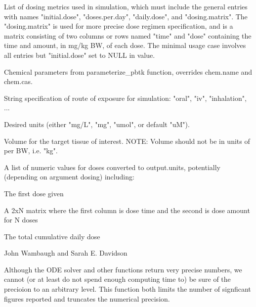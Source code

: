 \documentclass[a4paper]{book}
\begin{document}
%
\begin{Arguments}
\begin{ldescription}
\item[\code{dosing}] List of dosing metrics used in simulation, which must include
the general entries with names "initial.dose", "doses.per.day", 
"daily.dose", and "dosing.matrix". The "dosing.matrix" is used for more
precise dose regimen specification, and is a matrix consisting of two
columns or rows named "time" and "dose" containing the time and amount,
in mg/kg BW, of each dose. The minimal usage case involves all entries but
"initial.dose" set to NULL in value.

\item[\code{parameters}] Chemical parameters from parameterize\_pbtk function,
overrides chem.name and chem.cas.

\item[\code{route}] String specification of route of exposure for simulation:
"oral", "iv", "inhalation", ...

\item[\code{output.units}] Desired units (either "mg/L", "mg", "umol", or default
"uM").

\item[\code{vol}] Volume for the target tissue of interest.
NOTE: Volume should not be in units of per BW, i.e. "kg".
\end{ldescription}
\end{Arguments}
%
\begin{Value}
A list of numeric values for doses converted to output.units, potentially
(depending on argument dosing) including:
\begin{ldescription}
\item[\code{initial.dose}] The first dose given
\item[\code{dosing.matrix}] A 2xN matrix where the first column is dose time and
the second is dose amount for N doses
\item[\code{daily.dose}] The total cumulative daily dose
\end{ldescription}
\end{Value}
%
\begin{Author}\relax
John Wambaugh and Sarah E. Davidson
\end{Author}
%
\begin{Description}\relax
Although the ODE solver and other functions return very precise numbers,
we cannot (or at least do not spend enough computing time to) be sure of the 
precioion to an arbitrary level. This function both limits the number of
signficant figures reported and truncates the numerical precision.
\end{Description}
\end{document}

